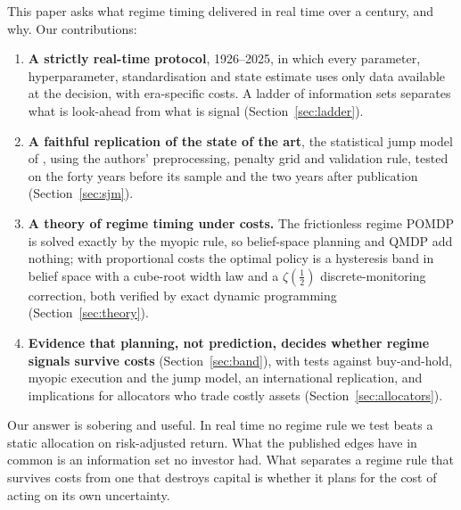 \documentclass[sigconf,nonacm]{acmart}
\begin{document}
This paper asks what regime timing delivered in real time over a century, and why. Our contributions:
\begin{enumerate}
\item \textbf{A strictly real-time protocol}, 1926--2025, in which every parameter, hyperparameter, standardisation and state estimate uses only data available at the decision, with era-specific costs. A ladder of information sets separates what is look-ahead from what is signal (Section~\ref{sec:ladder}).
\item \textbf{A faithful replication of the state of the art}, the statistical jump model of \citet{shu2024downside}, using the authors' preprocessing, penalty grid and validation rule, tested on the forty years before its sample and the two years after publication (Section~\ref{sec:sjm}).
\item \textbf{A theory of regime timing under costs.} The frictionless regime POMDP is solved exactly by the myopic rule, so belief-space planning and QMDP add nothing; with proportional costs the optimal policy is a hysteresis band in belief space with a cube-root width law and a $\zeta(\tfrac12)$ discrete-monitoring correction, both verified by exact dynamic programming (Section~\ref{sec:theory}).
\item \textbf{Evidence that planning, not prediction, decides whether regime signals survive costs} (Section~\ref{sec:band}), with tests against buy-and-hold, myopic execution and the jump model, an international replication, and implications for allocators who trade costly assets (Section~\ref{sec:allocators}).
\end{enumerate}
Our answer is sobering and useful. In real time no regime rule we test beats a static allocation on risk-adjusted return. What the published edges have in common is an information set no investor had. What separates a regime rule that survives costs from one that destroys capital is whether it plans for the cost of acting on its own uncertainty.
\end{document}
